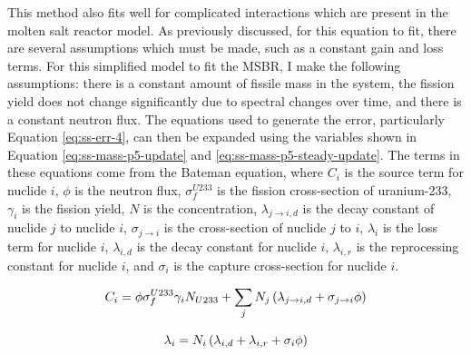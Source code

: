 This method also fits well for complicated interactions which are present in the molten salt reactor model.
As previously discussed, for this equation to fit, there are several assumptions which must be made, such as a constant gain and loss terms.
For this simplified model to fit the MSBR, I make the following assumptions: there is a constant amount of fissile mass in the system, the fission yield does not change significantly due to spectral changes over time, and there is a constant neutron flux.
The equations used to generate the error, particularly Equation \eqref{eq:ss-err-4}, can then be expanded using the variables shown in Equation \eqref{eq:ss-mass-p5-update} and \eqref{eq:ss-mass-p5-steady-update}. The terms in these equations come from the Bateman equation, where $C_i$ is the source term for nuclide $i$, $\phi$ is the neutron flux, $\sigma^{U233}_f$ is the fission cross-section of uranium-233, $\gamma_i$ is the fission yield, $N$ is the concentration, $\lambda_{j \rightarrow i, d }$ is the decay constant of nuclide $j$ to nuclide $i$, $\sigma_{j \rightarrow i}$ is the cross-section of nuclide $j$ to $i$, $\lambda_i$ is the loss term for nuclide $i$, $\lambda_{i, d}$ is the decay constant for nuclide $i$, $\lambda_{i, r}$ is the reprocessing constant for nuclide $i$, and $\sigma_i$ is the capture cross-section for nuclide $i$.

\begin{equation} \hfill 
C_i = \phi \sigma^{U233}_f \gamma_i N_{U233} + \sum_j N_j \left( \lambda_{j \rightarrow i, d }  + \sigma_{j \rightarrow i} \phi \right)
\hfill\label{eq:ss-mass-p5-update} \end{equation}

\begin{equation} \hfill 
\lambda_i = N_i \left( \lambda_{i, d} + \lambda_{i, r} + \sigma_i \phi \right)
\hfill\label{eq:ss-mass-p5-steady-update} \end{equation}

